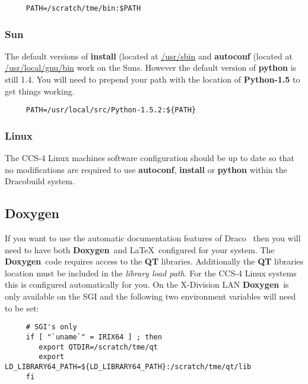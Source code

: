 \documentclass[10pt]{nmemo}
\newcommand{\draco}{{\normalfont\sffamily Draco}}
\newcommand{\doxygen}{{\normalfont\bfseries Doxygen}}
\begin{document}
\footnotesize
\begin{verbatim}
     PATH=/scratch/tme/bin:$PATH
\end{verbatim} %
\normalsize

\subsubsection{Sun}

The default versions of \textbf{install} (located at \url{/usr/sbin}
and \textbf{autoconf} (located at \url{/usr/local/gnu/bin} work on
the Suns.  However the default version of \textbf{python} is still
1.4.  You will need to prepend your path with the location of
\textbf{Python-1.5} to get things working.

\footnotesize
\begin{verbatim}
     PATH=/usr/local/src/Python-1.5.2:${PATH}
\end{verbatim} %
\normalsize

\subsubsection{Linux}

The CCS-4 Linux machines software configuration should be up to date
so that no modifications are required to use \textbf{autoconf},
\textbf{install} or \textbf{python} within the \draco build system.

\subsection{Doxygen}
\label{doxygen}

If you want to use the automatic documentation features of
\draco~\cite{doxygen} then you will need to have both \doxygen\ and
\LaTeX\ configured for your system.  The \doxygen\ code requires
access to the \textbf{QT} libraries.  Additionally the \textbf{QT}
libraries location must be included in the \emph{library load path}.
For the CCS-4 Linux systems this is configured automatically for you.
On the X-Division LAN \doxygen\ is only available on the SGI and the
following two environment variables will need to be set:

\footnotesize
\begin{verbatim}
     # SGI's only
     if [ "`uname`" = IRIX64 ] ; then
        export QTDIR=/scratch/tme/qt 
        export LD_LIBRARY64_PATH=${LD_LIBRARY64_PATH}:/scratch/tme/qt/lib
     fi
\end{verbatim} %
\normalsize
\end{document}
